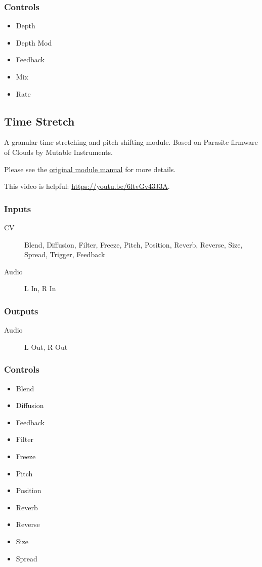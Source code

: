 \subsubsection{Controls}
\begin{itemize}
\item Depth
\item Depth Mod
\item Feedback
\item Mix
\item Rate
\end{itemize}

\subsection{Time Stretch}

A granular time stretching and pitch shifting module. Based on Parasite firmware of Clouds by Mutable Instruments.



Please see the \href{https://mqtthiqs.github.io/parasites/clouds.html}{original module manual} for more details.

This video is helpful: \url{https://youtu.be/6ltvGv43J3A}.

\subsubsection{Inputs}
\begin{description}
\item [CV] Blend, Diffusion, Filter, Freeze, Pitch, Position, Reverb, Reverse, Size, Spread, Trigger, Feedback
\item [Audio] L In, R In
\end{description}

\subsubsection{Outputs}
\begin{description}
\item [Audio] L Out, R Out
\end{description}

\subsubsection{Controls}
\begin{itemize}
\item Blend
\item Diffusion
\item Feedback
\item Filter
\item Freeze
\item Pitch
\item Position
\item Reverb
\item Reverse
\item Size
\item Spread
\end{itemize}

